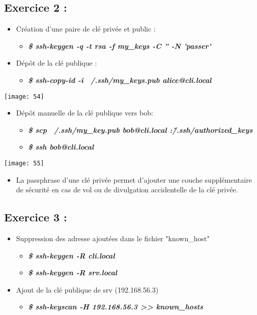 \documentclass[a4paper]{article}
\begin{document}
	\subsection*{Exercice 2 :}
	\begin{itemize}
		\item Création d'une paire de clé privée et public :
			\begin{itemize}
				\item \textbf{\textit{\$ ssh-keygen -q -t rsa -f my\_keys -C '' -N 'passer'}}
			\end{itemize}
		\item Dépôt de la clé publique :
			\begin{itemize}
				\item \textbf{\textit{\$ ssh-copy-id  -i ~/.ssh/my\_keys.pub alice@cli.local}}
			\end{itemize}
	\end{itemize}
	
	\texttt{[image: 54]}
	
	\begin{itemize}
		\item Dépôt manuelle de la clé publique vers bob:
			\begin{itemize}
				\item \textbf{\textit{\$ scp  ~/.ssh/my\_key.pub  bob@cli.local :\~/.ssh/authorized\_keys}}
				\item \textbf{\textit{\$ ssh bob@cli.local}}
			\end{itemize}
	\end{itemize}
	
	\texttt{[image: 55]}
	
	\begin{itemize}
		\item La passphrase d’une clé privée permet d’ajouter une couche supplémentaire de sécurité en cas de vol ou de divulgation accidentelle de la clé privée.

	\end{itemize}
	
	
	\subsection{Exercice 3 :}
	\begin{itemize}
		\item Suppression des adresse ajoutées dans le fichier "known\_host"
			\begin{itemize}
				\item \textbf{\textit{\$ ssh-keygen -R  cli.local}}
				\item \textbf{\textit{\$ ssh-keygen -R  srv.local}}
			\end{itemize}		
		\item Ajout de la clé publique de srv (192.168.56.3)
			\begin{itemize}
				\item \textbf{\textit{\$ ssh-keyscan -H  192.168.56.3 >> known\_hosts}}
			\end{itemize}
	\end{itemize}
	
\end{document}
